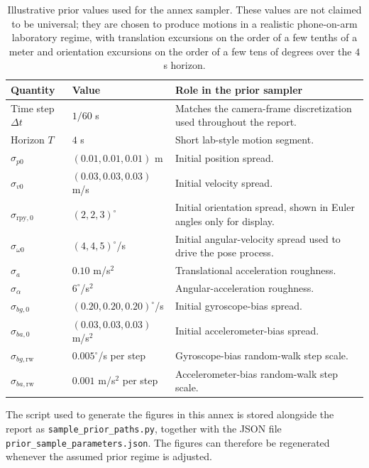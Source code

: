 \documentclass[11pt]{report}
\begin{document}
\begin{table}[H]
\centering
\small
\setlength{\tabcolsep}{5pt}
\begin{tabularx}{\textwidth}{p{}p{}X}
\toprule
\textbf{Quantity} & \textbf{Value} & \textbf{Role in the prior sampler}\\
\midrule
Time step $\Delta t$ & $1/60$ s & Matches the camera-frame discretization used throughout the report.\\
Horizon $T$ & $4$ s & Short lab-style motion segment.\\
$\sigma_{p0}$ & $(0.01,0.01,0.01)$ m & Initial position spread.\\
$\sigma_{v0}$ & $(0.03,0.03,0.03)$ m/s & Initial velocity spread.\\
$\sigma_{\mathrm{rpy},0}$ & $(2,2,3)^\circ$ & Initial orientation spread, shown in Euler angles only for display.\\
$\sigma_{\omega0}$ & $(4,4,5)^\circ$/s & Initial angular-velocity spread used to drive the pose process.\\
$\sigma_a$ & $0.10$ m/s$^2$ & Translational acceleration roughness.\\
$\sigma_\alpha$ & $6^\circ$/s$^2$ & Angular-acceleration roughness.\\
$\sigma_{bg,0}$ & $(0.20,0.20,0.20)^\circ$/s & Initial gyroscope-bias spread.\\
$\sigma_{ba,0}$ & $(0.03,0.03,0.03)$ m/s$^2$ & Initial accelerometer-bias spread.\\
$\sigma_{bg,\mathrm{rw}}$ & $0.005^\circ$/s per step & Gyroscope-bias random-walk step scale.\\
$\sigma_{ba,\mathrm{rw}}$ & $0.001$ m/s$^2$ per step & Accelerometer-bias random-walk step scale.\\
\bottomrule
\end{tabularx}
\caption{Illustrative prior values used for the annex sampler. These values are not claimed to be universal; they are chosen to produce motions in a realistic phone-on-arm laboratory regime, with translation excursions on the order of a few tenths of a meter and orientation excursions on the order of a few tens of degrees over the $4$ s horizon.}
\end{table}

The script used to generate the figures in this annex is stored alongside the report as \texttt{sample\_prior\_paths.py}, together with the JSON file \texttt{prior\_sample\_parameters.json}. The figures can therefore be regenerated whenever the assumed prior regime is adjusted.
\end{document}
